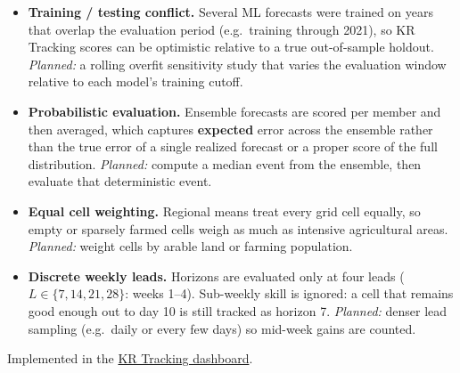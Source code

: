 \documentclass[11pt]{article}
\begin{document}
\begin{itemize}
  \item \textbf{Training / testing conflict.}
        Several ML forecasts were trained on years that overlap the
        evaluation period (e.g.\ training through 2021), so KR Tracking
        scores can be optimistic relative to a true out-of-sample holdout.
        \emph{Planned:} a rolling overfit sensitivity study that varies the
        evaluation window relative to each model's training cutoff.
  \item \textbf{Probabilistic evaluation.}
        Ensemble forecasts are scored per member and then averaged, which
        captures \textbf{expected} error across the ensemble rather than the
        true error of a single realized forecast or a proper score of the
        full distribution.
        \emph{Planned:} compute a median event from the ensemble, then evaluate
        that deterministic event.
  \item \textbf{Equal cell weighting.}
        Regional means treat every grid cell equally, so empty or sparsely
        farmed cells weigh as much as intensive agricultural areas.
        \emph{Planned:} weight cells by arable land or farming population.
  \item \textbf{Discrete weekly leads.}
        Horizons are evaluated only at four leads
        (\(L \in \{7,14,21,28\}\): weeks 1--4). Sub-weekly skill is ignored:
        a cell that remains good enough out to day 10 is still tracked as
        horizon 7.
        \emph{Planned:} denser lead sampling (e.g.\ daily or every few days)
        so mid-week gains are counted.
\end{itemize}

\vspace{1em}
\noindent Implemented in the
\href{https://dashboards.rhizaresearch.org/d/ee4mze492j0n4d/home?orgId=1\&from=now-6h\&to=now\&timezone=utc}{KR Tracking dashboard}.
\end{document}
